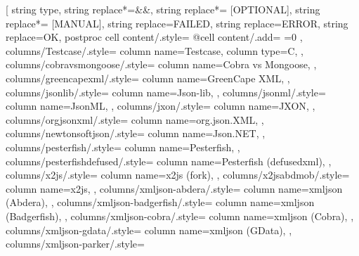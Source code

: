 \usepackage{colortbl}
\usepackage{makecell}
\usepackage{booktabs}
\usepackage{threeparttable}
\usepackage{pifont}
\newcommand{\cmark}{\ding{51}}%
\newcommand{\xmark}{\ding{55}}%
\usepackage[T1]{fontenc}
\usepackage{rubfonts2009}

  \begin{threeparttable}
\setlength{\tabcolsep}{1.25mm}
\pgfplotstabletypeset[
    string type,
    string replace*={&}{\&},
    string replace*={ [OPTIONAL]}{},
    string replace*={ [MANUAL]}{},
    string replace={FAILED}{},
    string replace={ERROR}{\xmark},
    string replace={OK}{\cmark},
    postproc cell content/.style={%
        @cell content/.add={
            \ifnum{}=0
                \color{white}
            \fi
           }{}
    },
    columns/Testcase/.style={
        column name=Testcase,
        column type={C},
    },
    columns/cobravsmongoose/.style={
        column name={Cobra vs Mongoose},
    },
    columns/greencapexml/.style={
        column name={GreenCape XML},
    },
    columns/jsonlib/.style={
        column name={Json-lib},
    },
    columns/jsonml/.style={
        column name={JsonML},
    },
    columns/jxon/.style={
        column name={JXON},
    },
    columns/orgjsonxml/.style={
        column name={org.json.XML},
    },
    columns/newtonsoftjson/.style={
        column name={Json.NET},
    },
    columns/pesterfish/.style={
        column name={Pesterfish},
    },
    columns/pesterfishdefused/.style={
        column name={Pesterfish (defusedxml)},
    },
    columns/x2js/.style={
        column name={x2js (fork)},
    },
    columns/x2jsabdmob/.style={
        column name=x2js,
    },
    columns/xmljson-abdera/.style={
        column name=xmljson (Abdera),
    },
    columns/xmljson-badgerfish/.style={
        column name=xmljson (Badgerfish),
    },
    columns/xmljson-cobra/.style={
        column name=xmljson (Cobra),
    },
    columns/xmljson-gdata/.style={
        column name=xmljson (GData),
    },
    columns/xmljson-parker/.style={
}
\end{threeparttable}

